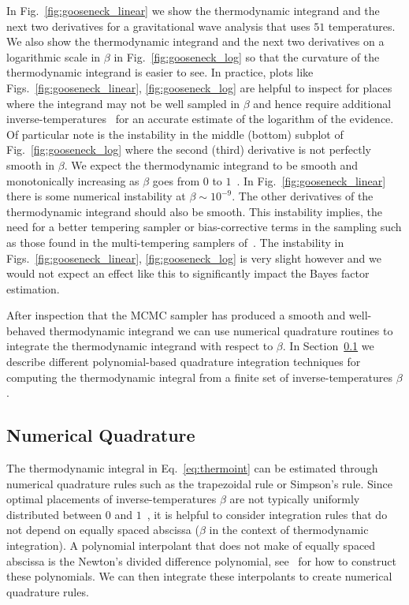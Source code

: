 In Fig.~\ref{fig:gooseneck_linear} we show the thermodynamic integrand and the next two derivatives for a gravitational wave analysis that uses $51$ temperatures. We also show the thermodynamic integrand and the next two derivatives on a logarithmic scale in $\beta$ in Fig.~\ref{fig:gooseneck_log} so that the curvature of the thermodynamic integrand is easier to see. In practice, plots like Figs.~\ref{fig:gooseneck_linear}, \ref{fig:gooseneck_log} are helpful to inspect for places where the integrand may not be well sampled in $\beta$ and hence require additional inverse-temperatures~\cite{liu2016evaluating, de2011free, de2013comparison} for an accurate estimate of the logarithm of the evidence. Of particular note is the instability in the middle (bottom) subplot of Fig.~\ref{fig:gooseneck_log} where the second (third) derivative is not perfectly smooth in $\beta$. We expect the thermodynamic integrand to be smooth and monotonically increasing as $\beta$ goes from $0$ to $1$~\cite{annis2019thermodynamic}. In Fig.~\ref{fig:gooseneck_linear} there is some numerical instability at $\beta \sim 10^{-9}$. The other derivatives of the thermodynamic integrand should also be smooth. This instability implies, the need for a better tempering sampler or bias-corrective terms in the sampling such as those found in the multi-tempering samplers of~\cite{oates2017control,evans2019thermodynamic}. The instability in Figs.~\ref{fig:gooseneck_linear}, \ref{fig:gooseneck_log} is very slight however and we would not expect an effect like this to significantly impact the Bayes factor estimation.

After inspection that the MCMC sampler has produced a smooth and well-behaved thermodynamic integrand we can use numerical quadrature routines to integrate the thermodynamic integrand with respect to $\beta$. In Section~\ref{sec:ti_num_quad} we describe different polynomial-based quadrature integration techniques for computing the thermodynamic integral from a finite set of inverse-temperatures $\beta$.

\subsection{Numerical Quadrature}\label{sec:ti_num_quad}
The thermodynamic integral in Eq.~\ref{eq:thermoint} can be estimated through numerical quadrature rules such as the trapezoidal rule or Simpson's rule. Since optimal placements of inverse-temperatures $\beta$ are not typically uniformly distributed between $0$ and $1$~\cite{annis2019thermodynamic}, it is helpful to consider integration rules that do not depend on equally spaced abscissa ($\beta$ in the context of thermodynamic integration). A polynomial interpolant that does not make of equally spaced abscissa is the Newton's divided difference polynomial, see~\cite{brun1953generalization, selmer1958numerical, abramowitz1965handbook} for how to construct these polynomials. We can then integrate these interpolants to create numerical quadrature rules.

